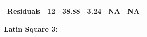 \documentclass[]{article}
\begin{document}
\begin{longtable}[]{@{}cccccc@{}}
\begin{minipage}[t]{0.19\columnwidth}
\textbf{Residuals}\strut
\end{minipage} & \begin{minipage}[t]{0.06\columnwidth}\centering\strut
12\strut
\end{minipage} & \begin{minipage}[t]{0.10\columnwidth}\centering\strut
38.88\strut
\end{minipage} & \begin{minipage}[t]{0.12\columnwidth}\centering\strut
3.24\strut
\end{minipage} & \begin{minipage}[t]{0.12\columnwidth}\centering\strut
NA\strut
\end{minipage} & \begin{minipage}[t]{0.12\columnwidth}\centering\strut
NA\strut
\end{minipage}\tabularnewline
\bottomrule
\end{longtable}

\textbf{Latin Square 3:}
\end{document}
